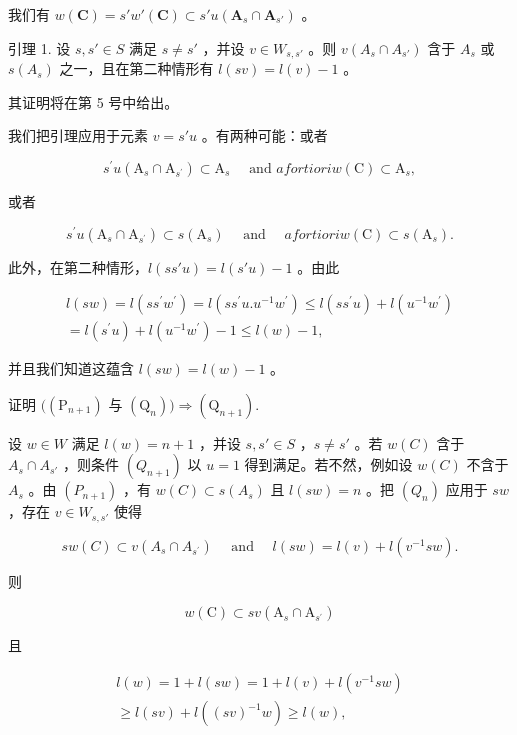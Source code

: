 我们有 \(w(\mathbf{C}) = s'w'(\mathbf{C}) \subset s'u(\mathbf{A}_s \cap \mathbf{A}_{s'})\) 。

引理 1. 设 \(s, s' \in S\) 满足 \(s \neq s'\) ，并设 \(v \in W_{s,s'}\) 。则 \(v(A_s \cap A_{s'})\) 含于 \(A_s\) 或 \(s(A_s)\) 之一，且在第二种情形有 \(l(sv) = l(v) - 1\) 。

其证明将在第 5 号中给出。

我们把引理应用于元素 \(v = s'u\) 。有两种可能：或者

\[
  s ^ {\prime} u \left(\mathrm{A} _ {s} \cap \mathrm{A} _ {s ^ {\prime}}\right) \subset \mathrm{A} _ {s} \quad \text { and } a fortiori w (\mathrm{C}) \subset \mathrm{A} _ {s},
\]

或者

\[
  s ^ {\prime} u \left(\mathrm{A} _ {s} \cap \mathrm{A} _ {s ^ {\prime}}\right) \subset s \left(\mathrm{A} _ {s}\right) \quad \text { and } \quad a fortiori w (\mathrm{C}) \subset s \left(\mathrm{A} _ {s}\right).
\]

此外，在第二种情形，\(l(ss'u) = l(s'u) - 1\) 。由此

\[
\begin{array}{c} l (s w) = l (s s ^ {\prime} w ^ {\prime}) = l (s s ^ {\prime} u. u ^ {- 1} w ^ {\prime}) \leqslant l (s s ^ {\prime} u) + l (u ^ {- 1} w ^ {\prime}) \\ = l (s ^ {\prime} u) + l (u ^ {- 1} w ^ {\prime}) - 1 \leqslant l (w) - 1, \end{array}
\]

并且我们知道这蕴含 \(l(sw) = l(w) - 1\) 。

证明 \(((\mathrm{P}_{n + 1})\) 与 \((\mathrm{Q}_n))\Longrightarrow (\mathrm{Q}_{n + 1}).\)

设 \(w \in W\) 满足 \(l(w) = n + 1\) ，并设 \(s, s' \in S\) ，\(s \neq s'\) 。若 \(w(C)\) 含于 \(A_s \cap A_{s'}\) ，则条件 \((Q_{n+1})\) 以 \(u = 1\) 得到满足。若不然，例如设 \(w(C)\) 不含于 \(A_s\) 。由 \((P_{n+1})\) ，有 \(w(C) \subset s(A_s)\) 且 \(l(sw) = n\) 。把 \((Q_n)\) 应用于 \(sw\) ，存在 \(v \in W_{s,s'}\) 使得

\[
s w (C) \subset v \left(A _ {s} \cap A _ {s ^ {\prime}}\right) \quad \text { and } \quad l (s w) = l (v) + l \left(v ^ {- 1} s w\right).
\]

则

\[
w (\mathrm{C}) \subset s v \left(\mathrm{A} _ {s} \cap \mathrm{A} _ {s ^ {\prime}}\right)
\]

且

\[
\begin{array}{c} l (w) = 1 + l (s w) = 1 + l (v) + l (v ^ {- 1} s w) \\ \geqslant l (s v) + l ((s v) ^ {- 1} w) \geqslant l (w), \end{array}
\]

